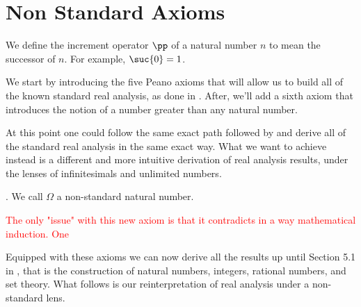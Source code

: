 \section{Non Standard Axioms}
We define the increment operator $\pp$ of a natural number $n$ to mean the successor of $n$. For example, $\suc{0}=1$.

We start by introducing the five Peano axioms that will allow us to build all of the known standard real analysis, as done in \cite{tao2022analysis}. After, we'll add a sixth axiom that introduces the notion of a number greater than any natural number. 
\newline

At this point one could follow the same exact path followed by \cite{tao2022analysis} and derive all of the standard real analysis in the same exact way. What we want to achieve instead is a different and more intuitive derivation of real analysis results, under the lenses of infinitesimals and unlimited numbers. 

. We call $\Omega$ a non-standard natural number. 
\newline

\textcolor{red}{The only "issue" with this new axiom is that it contradicts in a way mathematical induction. One }

Equipped with these axioms we can now derive all the results up until Section 5.1 in \cite{tao2022analysis}, that is the construction of natural numbers, integers, rational numbers, and set theory. What follows is our reinterpretation of real analysis under a non-standard lens.